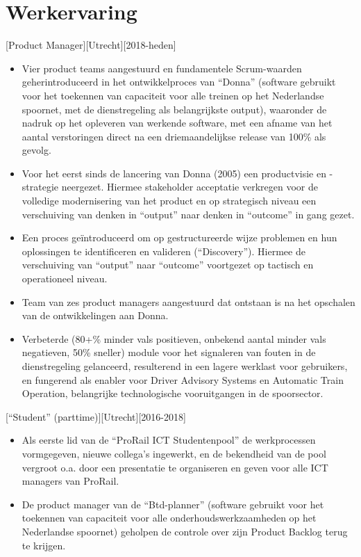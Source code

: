 \documentclass[10pt]{article}
\begin{document}
\makecvtitle

\section{Werkervaring}
\label{sec:work}

[Product Manager][Utrecht][2018-heden]
\begin{itemize}
      \item Vier product teams aangestuurd en fundamentele Scrum-waarden
            geherintroduceerd in het ontwikkelproces van \enquote{Donna} (software gebruikt
            voor het toekennen van capaciteit voor alle treinen op het Nederlandse
            spoornet, met de dienstregeling als belangrijkste output), waaronder de nadruk
            op het opleveren van werkende software, met een afname van het aantal
            verstoringen direct na een driemaandelijkse release van 100\% als gevolg.
      \item Voor het eerst sinds de lancering van Donna (2005) een productvisie en
            -strategie neergezet. Hiermee stakeholder acceptatie verkregen voor de
            volledige modernisering van het product en op strategisch niveau een
            verschuiving van denken in “output” naar denken in “outcome” in gang gezet.
      \item Een proces geïntroduceerd om op gestructureerde wijze problemen en hun
            oplossingen te identificeren en valideren (\enquote{Discovery}). Hiermee de
            verschuiving van “output” naar “outcome” voortgezet op tactisch en operationeel
            niveau.
      \item Team van zes product managers aangestuurd dat ontstaan is na het
            opschalen van de ontwikkelingen aan Donna.
      \item Verbeterde (80+\% minder vals positieven, onbekend aantal minder vals
            negatieven, 50\% sneller) module voor het signaleren van fouten in de
            dienstregeling gelanceerd, resulterend in een lagere werklast voor gebruikers,
            en fungerend als enabler voor Driver Advisory Systems en Automatic Train
            Operation, belangrijke technologische vooruitgangen in de spoorsector.
\end{itemize}

[\enquote{Student} (parttime)][Utrecht][2016-2018]
\begin{itemize}
      \item Als eerste lid van de \enquote{ProRail ICT Studentenpool} de
            werkprocessen vormgegeven, nieuwe collega's ingewerkt, en de bekendheid van de
            pool vergroot o.a. door een presentatie te organiseren en geven voor alle ICT
            managers van ProRail.
      \item De product manager van de \enquote{Btd-planner} (software gebruikt voor
            het toekennen van capaciteit voor alle onderhoudswerkzaamheden op het
            Nederlandse spoornet) geholpen de controle over zijn Product Backlog terug te
            krijgen.
\end{itemize}
\end{document}

